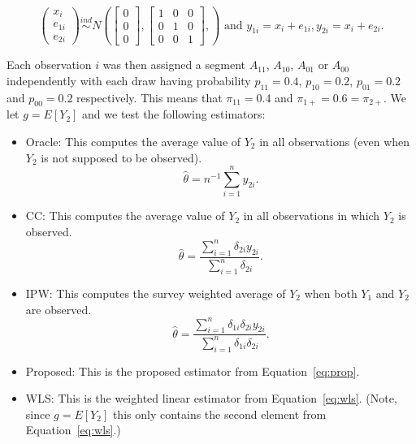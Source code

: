 \documentclass[12pt]{article}
\begin{document}
\begin{itemize}
    \[
      \begin{pmatrix}
        x_i \\ e_{1i} \\ e_{2i}
      \end{pmatrix} \stackrel{ind}{\sim}
      N \left(
      \begin{bmatrix}
        0 \\ 0 \\ 0
      \end{bmatrix},
      \begin{bmatrix}
        1 & 0 & 0 \\
        0 & 1 & 0 \\ 
        0 & 0 & 1 
      \end{bmatrix},
      \right) \text{ and }
      y_{1i} = x_i + e_{1i}, y_{2i} = x_i + e_{2i}.
    \]

    Each observation $i$ was then assigned a segment $A_{11}$, $A_{10}$,
    $A_{01}$ or $A_{00}$ independently with each draw having probability
    $p_{11} = 0.4$, $p_{10} = 0.2$, $p_{01}= 0.2$ and $p_{00} = 0.2$
    respectively. This means that $\pi_{11} = 0.4$ and 
    $\pi_{1+} = 0.6 = \pi_{2+}$. We let $g = E[Y_2]$ and we test the following
    estimators:

    \begin{itemize}
      \item Oracle: This computes the average value of $Y_2$ in all 
        observations (even when $Y_2$ is not supposed to be observed).
        \[\hat \theta = n^{-1} \sum_{i = 1}^n y_{2i}.\]

      \item CC: This computes the average value of $Y_2$ in all observations 
        in which $Y_2$ is observed.
        \[\hat \theta = \frac{\sum_{i = 1}^n \delta_{2i} y_{2i}}
          {\sum_{i = 1}^n \delta_{2i}}.\]

      \item IPW: This computes the survey weighted average of $Y_2$ when both
        $Y_1$ and $Y_2$ are observed.
        \[\hat \theta = \frac{\sum_{i = 1}^n \delta_{1i}\delta_{2i} y_{2i}}
        {\sum_{i = 1}^n \delta_{1i}\delta_{2i}}.\]
      \item Proposed: This is the proposed estimator from Equation~\ref{eq:prop}.
      \item WLS: This is the weighted linear estimator from Equation~\ref{eq:wls}.
        (Note, since $g = E[Y_2]$ this only contains the second element from
        Equation~\ref{eq:wls}.)
    \end{itemize}


\end{itemize}
\end{document}
